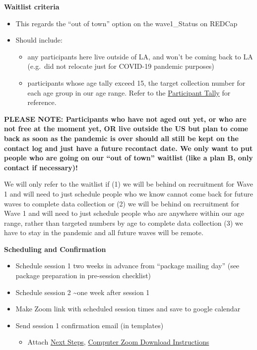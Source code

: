 \documentclass[]{book}
\providecommand{\tightlist}{%
  \setlength{\itemsep}{0pt}\setlength{\parskip}{0pt}}
\begin{document}
\textbf{Waitlist criteria}

\begin{itemize}
\tightlist
\item
  This regards the ``out of town'' option on the wave1\_Status on REDCap
\item
  Should include:

  \begin{itemize}
  \tightlist
  \item
    any participants here live outside of LA, and won't be coming back to LA (e.g.~did not relocate just for COVID-19 pandemic purposes)
  \item
    participants whose age tally exceed 15, the target collection number for each age group in our age range. Refer to the \href{https://ucla.app.box.com/file/724688028024}{Participant Tally} for reference.
  \end{itemize}
\end{itemize}

\textbf{PLEASE NOTE: Participants who have not aged out yet, or who are not free at the moment yet, OR live outside the US but plan to come back as soon as the pandemic is over should all still be kept on the contact log and just have a future recontact date. We only want to put people who are going on our ``out of town'' waitlist (like a plan B, only contact if necessary)!}

We will only refer to the waitlist if (1) we will be behind on recruitment for Wave 1 and will need to just schedule people who we know cannot come back for future waves to complete data collection or (2) we will be behind on recruitment for Wave 1 and will need to just schedule people who are anywhere within our age range, rather than targeted numbers by age to complete data collection (3) we have to stay in the pandemic and all future waves will be remote.

\textbf{Scheduling and Confirmation}

\begin{itemize}
\tightlist
\item
  Schedule session 1 two weeks in advance from ``package mailing day'' (see package preparation in pre-session checklist)
\item
  Schedule session 2 \textasciitilde{}one week after session 1
\item
  Make Zoom link with scheduled session times and save to google calendar
\item
  Send session 1 confirmation email (in templates)

  \begin{itemize}
  \tightlist
  \item
    Attach \href{https://ucla.app.box.com/file/665452959932}{Next Steps}, \href{https://ucla.app.box.com/file/680632734387}{Computer Zoom Download Instructions}
  \end{itemize}
\end{itemize}
\end{document}
